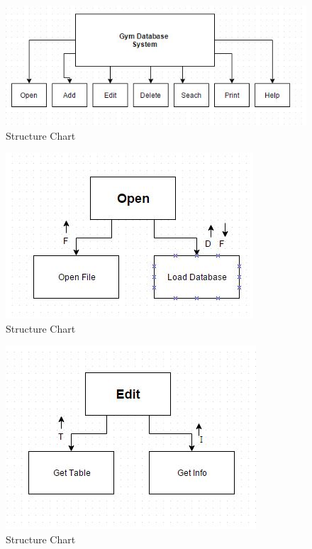 \begin{figure}[H]
    \includegraphics[width=\textwidth]{HChart1.JPG}
    \caption{Structure Chart} \label{fig:StructureChart}
\end{figure}

\begin{figure}[H]
    \includegraphics[width=\textwidth]{HChart2.JPG}
    \caption{Structure Chart} \label{fig:StructureChart}
\end{figure}

\begin{figure}[H]
    \includegraphics[width=\textwidth]{HChart3.JPG}
    \caption{Structure Chart} \label{fig:StructureChart}
\end{figure}

